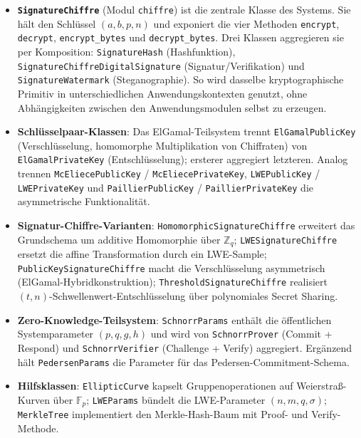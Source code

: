 ﻿\documentclass[a4paper,12pt]{scrreprt}
\theoremstyle{definition}
\begin{document}
\begin{itemize}
	\item \textbf{\texttt{SignatureChiffre}} (Modul \texttt{chiffre}) ist die zentrale Klasse des Systems. Sie hält den Schlüssel $(a, b, p, n)$ und exponiert die vier Methoden \texttt{encrypt}, \texttt{decrypt}, \texttt{encrypt\_bytes} und \texttt{decrypt\_bytes}. Drei Klassen aggregieren sie per Komposition: \texttt{Signature\-Hash} (Hashfunktion), \texttt{SignatureChiffreDigitalSigna\newline ture} (Signatur\-/Verifikation) und \texttt{SignatureWatermark} (Steganographie). So wird dasselbe kryptographische Primitiv in unterschiedlichen Anwendungskontexten genutzt, ohne Abhängigkeiten zwischen den Anwendungsmodulen selbst zu erzeugen.
	\item \textbf{Schlüsselpaar-Klassen}: Das ElGamal-Teilsystem trennt \texttt{ElGamalPublicKey} (Verschlüsselung, homomorphe Multiplikation von Chiffraten) von \texttt{ElGamalPrivate\newline Key} (Entschlüsselung); ersterer aggregiert letzteren. Analog trennen \texttt{McEliece\newline PublicKey} / \texttt{McEliecePrivateKey}, \texttt{LWEPublicKey} / \texttt{LWEPrivateKey} und \texttt{PaillierPublicKey} / \texttt{PaillierPrivateKey} die asymmetrische Funktionalität.
	\item \textbf{Signatur-Chiffre-Varianten}: \texttt{HomomorphicSignatureChiffre} erweitert das Grundschema um additive Homomorphie über $\mathbb{Z}_q$; \texttt{LWESignatureChiffre} ersetzt die affine Transformation durch ein LWE-Sample; \texttt{PublicKeySignatureChiffre} macht die Verschlüsselung asymmetrisch (ElGamal-Hybridkonstruktion); \texttt{Threshold\newline SignatureChiffre} realisiert $(t,n)$-Schwellenwert-Entschlüsselung über polynomiales Secret Sharing.
	\item \textbf{Zero-Knowledge-Teilsystem}: \texttt{SchnorrParams} enthält die öffentlichen Systemparameter $(p,q,g,h)$ und wird von \texttt{SchnorrProver} (Commit + Respond) und \texttt{SchnorrVerifier} (Challenge + Verify) aggregiert. Ergänzend hält \texttt{Pedersen\newline Params} die Parameter für das Pedersen-Commitment-Schema.
	\item \textbf{Hilfsklassen}: \texttt{EllipticCurve} kapselt Gruppenoperationen auf Weierstraß-Kurven über $\mathbb{F}_p$; \texttt{LWEParams} bündelt die LWE-Parameter $(n, m, q, \sigma)$; \texttt{MerkleTree} implementiert den Merkle-Hash-Baum mit Proof- und Verify-Methode.
\end{itemize}
\end{document}
